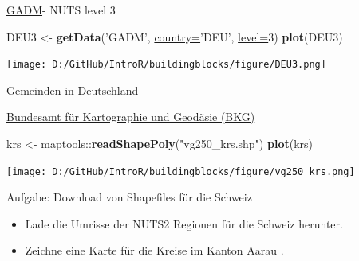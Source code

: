 \documentclass[ignorenonframetext,]{beamer}
\newenvironment{Shaded}{\begin{snugshade}}{\end{snugshade}}
\newcommand{\DataTypeTok}[1]{\textcolor[rgb]{0.74,0.68,0.62}{\underline{#1}}}
\newcommand{\DecValTok}[1]{\textcolor[rgb]{0.27,0.67,0.26}{#1}}
\newcommand{\KeywordTok}[1]{\textcolor[rgb]{0.26,0.66,0.93}{\textbf{#1}}}
\newcommand{\NormalTok}[1]{\textcolor[rgb]{0.74,0.68,0.62}{#1}}
\newcommand{\OperatorTok}[1]{\textcolor[rgb]{0.74,0.68,0.62}{#1}}
\newcommand{\StringTok}[1]{\textcolor[rgb]{0.02,0.61,0.04}{#1}}
\providecommand{\tightlist}{%
  \setlength{\itemsep}{0pt}\setlength{\parskip}{0pt}}
\begin{document}
\begin{frame}[fragile]{\href{http://www.gadm.org/}{GADM}- NUTS level 3}
\protect\hypertarget{gadm--nuts-level-3-1}{}

\begin{Shaded}
\begin{Highlighting}[]
\NormalTok{DEU3 <-}\StringTok{ }\KeywordTok{getData}\NormalTok{(}\StringTok{'GADM'}\NormalTok{, }\DataTypeTok{country=}\StringTok{'DEU'}\NormalTok{, }\DataTypeTok{level=}\DecValTok{3}\NormalTok{)}
\KeywordTok{plot}\NormalTok{(DEU3)}
\end{Highlighting}
\end{Shaded}

\texttt{[image: D:/GitHub/IntroR/buildingblocks/figure/DEU3.png]}

\end{frame}

\begin{frame}[fragile]{Gemeinden in Deutschland}
\protect\hypertarget{gemeinden-in-deutschland}{}

\href{http://www.geodatenzentrum.de/geodaten/gdz_rahmen.gdz_div?gdz_spr=deu\&gdz_akt_zeile=5\&gdz_anz_zeile=1\&gdz_unt_zeile=15\&gdz_user_id=0}{Bundesamt
für Kartographie und Geodäsie (BKG)}

\begin{Shaded}
\begin{Highlighting}[]
\NormalTok{krs <-}\StringTok{ }\NormalTok{maptools}\OperatorTok{::}\KeywordTok{readShapePoly}\NormalTok{(}\StringTok{"vg250_krs.shp"}\NormalTok{)}
\KeywordTok{plot}\NormalTok{(krs)}
\end{Highlighting}
\end{Shaded}

\texttt{[image: D:/GitHub/IntroR/buildingblocks/figure/vg250\_krs.png]}

\end{frame}

\begin{frame}{Aufgabe: Download von Shapefiles für die Schweiz}
\protect\hypertarget{aufgabe-download-von-shapefiles-fur-die-schweiz}{}

\begin{itemize}
\tightlist
\item
  Lade die Umrisse der NUTS2 Regionen für die Schweiz herunter.
\item
  Zeichne eine Karte für die Kreise im Kanton Aarau .
\end{itemize}

\end{frame}
\end{document}
